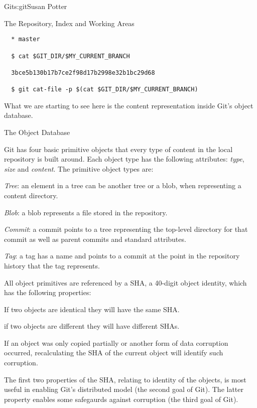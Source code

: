 \begin{aosachapter}{Git}{s:git}{Susan Potter}
\begin{aosasect1}{The Repository, Index and Working Areas}
\begin{verbatim}
  * master

  $ cat $GIT_DIR/$MY_CURRENT_BRANCH

  3bce5b130b17b7ce2f98d17b2998e32b1bc29d68

  $ git cat-file -p $(cat $GIT_DIR/$MY_CURRENT_BRANCH)
\end{verbatim}

\noindent What we are starting to see here is the content representation inside Git's
object database.

\end{aosasect1}

\begin{aosasect1}{The Object Database}


Git has four basic primitive objects that every type of content in the
local repository is built around. Each object type has the following
attributes: \emph{type}, \emph{size} and \emph{content}. The primitive object
types are:
\begin{aosaitemize}
  \item \emph{Tree}: an element in a tree can be another tree or a blob, when
  representing a content directory.
  \item \emph{Blob}: a blob represents a file stored in the repository.
  \item \emph{Commit}: a commit points to a tree representing the top-level
  directory for that commit as well as parent commits and standard
  attributes.
  \item \emph{Tag}: a tag has a name and points to a commit at the point in
  the repository history that the tag represents.
\end{aosaitemize}

All object primitives are referenced by a SHA, a 40-digit object identity,
which has the following properties:
\begin{aosaitemize}
  \item If two objects are identical they will have the same SHA.
  \item if two objects are different they will have different SHAs.
  \item If an object was only copied partially or another form of data
        corruption occurred, recalculating the SHA of the current object
        will identify such corruption.
\end{aosaitemize}

The first two properties of the SHA, relating to identity of the objects, is
most useful in enabling Git's distributed model (the second goal of Git).
The latter property enables some safegaurds against corruption (the third
goal of Git).


\end{aosasect1}
\end{aosachapter}
